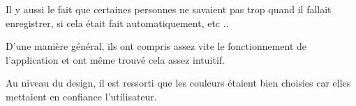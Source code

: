 \medskip

Il y aussi le fait que certaines personnes ne savaient pas trop quand il fallait enregistrer, si cela était fait automatiquement, etc ..

\medskip

D'une manière général, ils ont compris assez vite le fonctionnement de l'application et ont même trouvé cela assez intuitif.

\medskip

Au niveau du design, il est ressorti que les couleurs étaient bien choisies car elles mettaient en confiance l'utilisateur.
